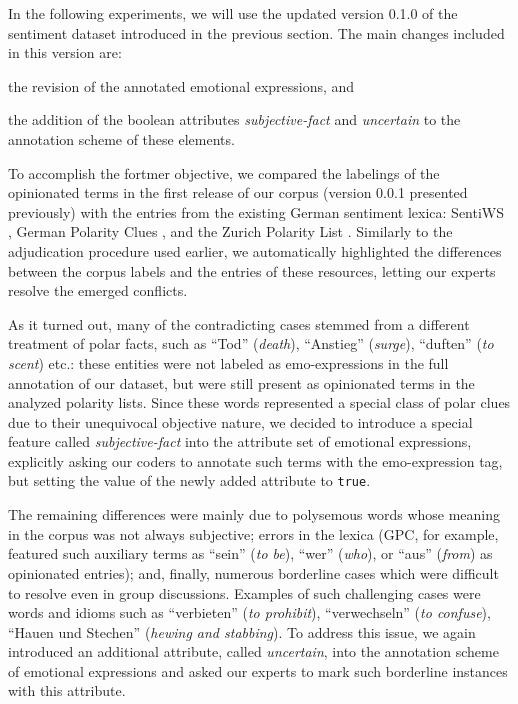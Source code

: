 In the following experiments, we will use the updated version 0.1.0 of
the sentiment dataset introduced in the previous section.  The main
changes included in this version are:
\begin{inparaenum}
  \item the revision of the annotated emotional expressions, and
  \item the addition of the boolean attributes \emph{subjective-fact}
    and \emph{uncertain} to the annotation scheme of these elements.
\end{inparaenum}

To accomplish the fortmer objective, we compared the labelings of the
opinionated terms in the first release of our corpus (version 0.0.1
presented previously) with the entries from the existing German
sentiment lexica: SentiWS \cite{Remus:10}, German Polarity Clues
\cite{Waltinger:10}, and the Zurich Polarity List \cite{Clematide:10}.
Similarly to the adjudication procedure used earlier, we automatically
highlighted the differences between the corpus labels and the entries
of these resources, letting our experts resolve the emerged conflicts.

As it turned out, many of the contradicting cases stemmed from a
different treatment of polar facts, such as ``Tod'' (\emph{death}),
``Anstieg'' (\emph{surge}), ``duften'' (\emph{to scent}) etc.: these
entities were not labeled as emo-expressions in the full annotation of
our dataset, but were still present as opinionated terms in the
analyzed polarity lists.  Since these words represented a special
class of polar clues due to their unequivocal objective nature, we
decided to introduce a special feature called \emph{subjective-fact}
into the attribute set of emotional expressions, explicitly asking our
coders to annotate such terms with the emo-expression tag, but setting
the value of the newly added attribute to \texttt{true}.

The remaining differences were mainly due to polysemous words whose
meaning in the corpus was not always subjective; errors in the lexica
(GPC, for example, featured such auxiliary terms as ``sein'' (\emph{to
  be}), ``wer'' (\emph{who}), or ``aus'' (\emph{from}) as opinionated
entries); and, finally, numerous borderline cases which were difficult
to resolve even in group discussions.  Examples of such challenging
cases were words and idioms such as ``verbieten'' (\emph{to
  prohibit}), ``verwechseln'' (\emph{to confuse}), ``Hauen und
Stechen'' (\emph{hewing and stabbing}).  To address this issue, we
again introduced an additional attribute, called \emph{uncertain},
into the annotation scheme of emotional expressions and asked our
experts to mark such borderline instances with this attribute.

